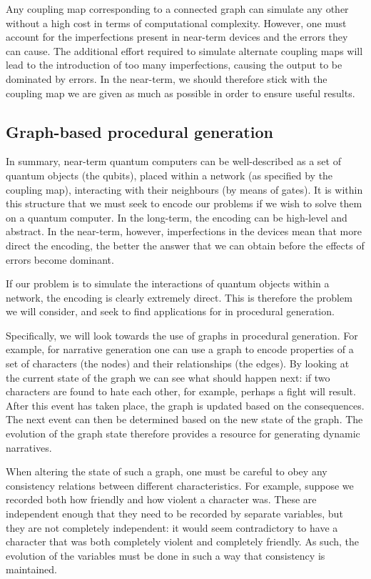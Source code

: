 \documentclass[conference]{IEEEtran}
\begin{document}

Any coupling map corresponding to a connected graph can simulate any other without a high cost in terms of computational complexity. However, one must account for the imperfections present in near-term devices and the errors they can cause. The additional effort required to simulate alternate coupling maps will lead to the introduction of too many imperfections, causing the output to be dominated by errors. In the near-term, we should therefore stick with the coupling map we are given as much as possible in order to ensure useful results.


\subsection{Graph-based procedural generation}

In summary, near-term quantum computers can be well-described as a set of quantum objects (the qubits), placed within a network (as specified by the coupling map), interacting with their neighbours (by means of gates). It is within this structure that we must seek to encode our problems if we wish to solve them on a quantum computer. In the long-term, the encoding can be high-level and abstract. In the near-term, however, imperfections in the devices mean that more direct the encoding, the better the answer that we can obtain before the effects of errors become dominant.

If our problem is to simulate the interactions of quantum objects within a network, the encoding is clearly extremely direct. This is therefore the problem we will consider, and seek to find applications for in procedural generation.

Specifically, we will look towards the use of graphs in procedural generation. For example, for narrative generation one can use a graph to encode properties of a set of characters (the nodes) and their relationships (the edges). By looking at the current state of the graph we can see what should happen next: if two characters are found to hate each other, for example, perhaps a fight will result. After this event has taken place, the graph is updated based on the consequences. The next event can then be determined based on the new state of the graph. The evolution of the graph state therefore provides a resource for generating dynamic narratives.

When altering the state of such a graph, one must be careful to obey any consistency relations between different characteristics. For example, suppose we recorded both how friendly and how violent a character was. These are independent enough that they need to be recorded by separate variables, but they are not completely independent: it would seem contradictory to have a character that was both completely violent and completely friendly. As such, the evolution of the variables must be done in such a way that consistency is maintained.
\end{document}

